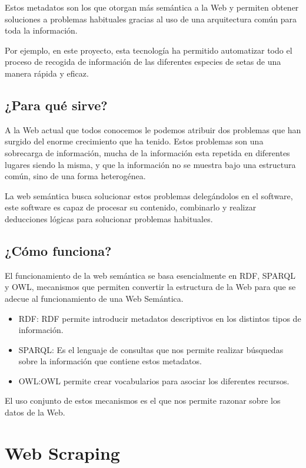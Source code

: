 Estos metadatos son los que otorgan más semántica a la Web y permiten obtener soluciones a problemas habituales gracias al uso de una arquitectura común para toda la información. 

Por ejemplo, en este proyecto, esta tecnología ha permitido automatizar todo el proceso de recogida de información de las diferentes especies de setas de una manera rápida y eficaz.

\subsection{¿Para qué sirve?}

A la Web actual que todos conocemos le podemos atribuir dos problemas que han surgido del enorme crecimiento que ha tenido. Estos problemas son una sobrecarga de información, mucha de la información esta repetida en diferentes lugares siendo la misma, y que la información no se muestra bajo una estructura común, sino de una forma heterogénea.

La web semántica busca solucionar estos problemas delegándolos en el software, este software es capaz de procesar su contenido, combinarlo y realizar deducciones lógicas para solucionar problemas habituales.

\subsection{¿Cómo funciona?}

El funcionamiento de la web semántica se basa esencialmente en RDF, SPARQL y OWL, mecanismos que permiten convertir la estructura de la Web para que se adecue al funcionamiento de una Web Semántica.
\begin{itemize}
	\item{RDF}: RDF permite introducir metadatos descriptivos en los distintos tipos de información.
	\item{SPARQL}: Es el lenguaje de consultas que nos permite realizar búsquedas sobre la información que contiene estos metadatos.
	\item{OWL}:OWL permite crear vocabularios para asociar los diferentes recursos.
\end{itemize}

El uso conjunto de estos mecanismos es el que nos permite razonar sobre los datos de la Web.

\section{Web Scraping}

